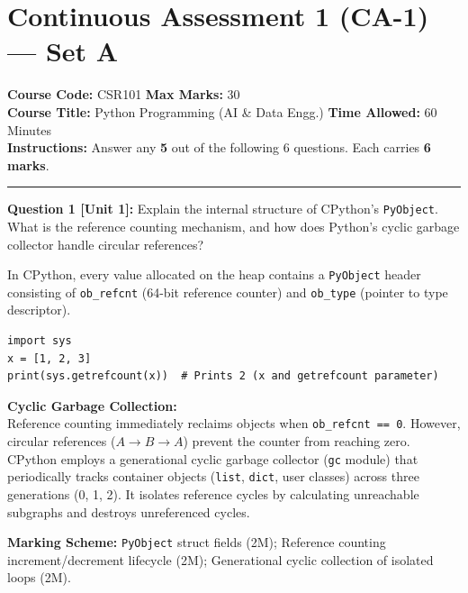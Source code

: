 \section{Continuous Assessment 1 (CA-1) --- Set A}
\noindent\textbf{Course Code:} CSR101 \hfill \textbf{Max Marks:} 30\\
\textbf{Course Title:} Python Programming (AI \& Data Engg.) \hfill \textbf{Time Allowed:} 60 Minutes\\
\textbf{Instructions:} Answer any \textbf{5} out of the following 6 questions. Each carries \textbf{6 marks}.
\vspace{4mm}
\hrule
\vspace{4mm}

\noindent\textbf{Question 1 [Unit 1]:} Explain the internal structure of CPython's \texttt{PyObject}. What is the reference counting mechanism, and how does Python's cyclic garbage collector handle circular references?
\begin{solutionbox}
In CPython, every value allocated on the heap contains a \texttt{PyObject} header consisting of \texttt{ob\_refcnt} (64-bit reference counter) and \texttt{ob\_type} (pointer to type descriptor).
\begin{lstlisting}
import sys
x = [1, 2, 3]
print(sys.getrefcount(x))  # Prints 2 (x and getrefcount parameter)
\end{lstlisting}
\textbf{Cyclic Garbage Collection:}\\
Reference counting immediately reclaims objects when \texttt{ob\_refcnt == 0}. However, circular references ($A \to B \to A$) prevent the counter from reaching zero. CPython employs a generational cyclic garbage collector (\texttt{gc} module) that periodically tracks container objects (\texttt{list}, \texttt{dict}, user classes) across three generations (0, 1, 2). It isolates reference cycles by calculating unreachable subgraphs and destroys unreferenced cycles.
\end{solutionbox}
\begin{markingrubric}
\textbf{Marking Scheme:} \texttt{PyObject} struct fields (2M); Reference counting increment/decrement lifecycle (2M); Generational cyclic collection of isolated loops (2M).
\end{markingrubric}


